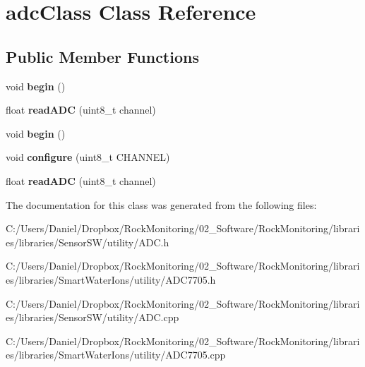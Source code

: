 \hypertarget{classadc_class}{}\section{adc\+Class Class Reference}
\label{classadc_class}
\subsection*{Public Member Functions}
\begin{DoxyCompactItemize}
\item 
void {\bfseries begin} ()\hypertarget{classadc_class_afb60b2d404da9d7b448ffc564146e6a3}{}\label{classadc_class_afb60b2d404da9d7b448ffc564146e6a3}

\item 
float {\bfseries read\+A\+DC} (uint8\+\_\+t channel)\hypertarget{classadc_class_a4f064f80beb59c9a625e6e9d70fb2594}{}\label{classadc_class_a4f064f80beb59c9a625e6e9d70fb2594}

\item 
void {\bfseries begin} ()\hypertarget{classadc_class_afb60b2d404da9d7b448ffc564146e6a3}{}\label{classadc_class_afb60b2d404da9d7b448ffc564146e6a3}

\item 
void {\bfseries configure} (uint8\+\_\+t C\+H\+A\+N\+N\+EL)\hypertarget{classadc_class_a8047339f8cf9571c8aa8d7df615b58e8}{}\label{classadc_class_a8047339f8cf9571c8aa8d7df615b58e8}

\item 
float {\bfseries read\+A\+DC} (uint8\+\_\+t channel)\hypertarget{classadc_class_a4f064f80beb59c9a625e6e9d70fb2594}{}\label{classadc_class_a4f064f80beb59c9a625e6e9d70fb2594}

\end{DoxyCompactItemize}


The documentation for this class was generated from the following files\+:\begin{DoxyCompactItemize}
\item 
C\+:/\+Users/\+Daniel/\+Dropbox/\+Rock\+Monitoring/02\+\_\+\+Software/\+Rock\+Monitoring/libraries/libraries/\+Sensor\+S\+W/utility/A\+D\+C.\+h\item 
C\+:/\+Users/\+Daniel/\+Dropbox/\+Rock\+Monitoring/02\+\_\+\+Software/\+Rock\+Monitoring/libraries/libraries/\+Smart\+Water\+Ions/utility/A\+D\+C7705.\+h\item 
C\+:/\+Users/\+Daniel/\+Dropbox/\+Rock\+Monitoring/02\+\_\+\+Software/\+Rock\+Monitoring/libraries/libraries/\+Sensor\+S\+W/utility/A\+D\+C.\+cpp\item 
C\+:/\+Users/\+Daniel/\+Dropbox/\+Rock\+Monitoring/02\+\_\+\+Software/\+Rock\+Monitoring/libraries/libraries/\+Smart\+Water\+Ions/utility/A\+D\+C7705.\+cpp\end{DoxyCompactItemize}
